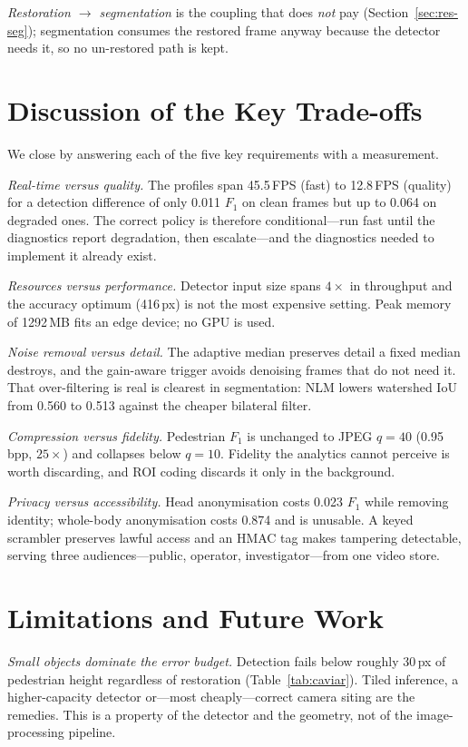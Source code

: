 \documentclass[conference,10pt]{IEEEtran}
\begin{document}
\textit{Restoration $\rightarrow$ segmentation} is the coupling that does
\emph{not} pay (Section~\ref{sec:res-seg}); segmentation consumes the restored
frame anyway because the detector needs it, so no un-restored path is kept.

\section{Discussion of the Key Trade-offs}\label{sec:tradeoffs}
We close by answering each of the five key requirements with a measurement.

\textit{Real-time versus quality.} The profiles span 45.5\,FPS
(\textsf{fast}) to 12.8\,FPS (\textsf{quality}) for a detection difference of
only 0.011 $F_1$ on clean frames but up to 0.064 on degraded ones. The correct
policy is therefore conditional---run \textsf{fast} until the diagnostics
report degradation, then escalate---and the diagnostics needed to implement it
already exist.

\textit{Resources versus performance.} Detector input size spans $4\times$ in
throughput and the accuracy optimum (416\,px) is not the most expensive
setting. Peak memory of 1292\,MB fits an edge device; no GPU is used.

\textit{Noise removal versus detail.} The adaptive median preserves detail a
fixed median destroys, and the gain-aware trigger avoids denoising frames that
do not need it. That over-filtering is real is clearest in segmentation: NLM
lowers watershed IoU from 0.560 to 0.513 against the cheaper bilateral filter.

\textit{Compression versus fidelity.} Pedestrian $F_1$ is unchanged to JPEG
$q{=}40$ (0.95\,bpp, $25\times$) and collapses below $q{=}10$. Fidelity the
analytics cannot perceive is worth discarding, and ROI coding discards it only
in the background.

\textit{Privacy versus accessibility.} Head anonymisation costs 0.023 $F_1$
while removing identity; whole-body anonymisation costs 0.874 and is unusable.
A keyed scrambler preserves lawful access and an HMAC tag makes tampering
detectable, serving three audiences---public, operator, investigator---from one
video store.

\section{Limitations and Future Work}\label{sec:limits}
\textit{Small objects dominate the error budget.} Detection fails below roughly
30\,px of pedestrian height regardless of restoration
(Table~\ref{tab:caviar}). Tiled inference, a higher-capacity detector or---most
cheaply---correct camera siting are the remedies. This is a property of the
detector and the geometry, not of the image-processing pipeline.
\end{document}
